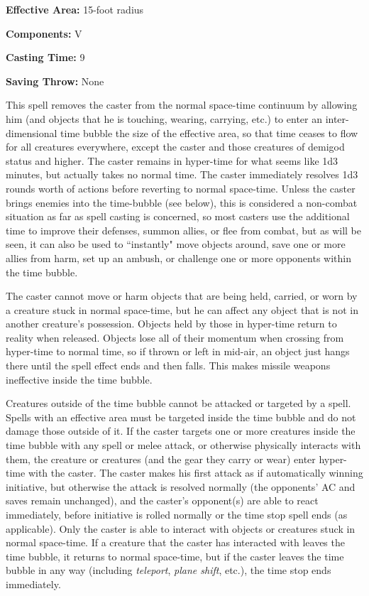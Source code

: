 \begin{multicols}{2}
\begin{minipage}{\columnwidth}
\noindent \textbf{Effective Area:} 15-foot radius

\noindent \textbf{Components:} V

\noindent \textbf{Casting Time:} 9

\noindent \textbf{Saving Throw:} None

\end{minipage}

This spell removes the caster from the normal space-time continuum by allowing him (and objects that he is touching, wearing, carrying, etc.) to enter an inter-dimensional time bubble the size of the effective area, so that time ceases to flow for all creatures everywhere, except the caster and those creatures of demigod status and higher.  The caster remains in hyper-time for what seems like 1d3 minutes, but actually takes no normal time.  The caster immediately resolves 1d3 rounds worth of actions before reverting to normal space-time.  Unless the caster brings enemies into the time-bubble (see below), this is considered a non-combat situation as far as spell casting is concerned, so most casters use the additional time to improve their defenses, summon allies, or flee from combat, but as will be seen, it can also be used to ``instantly" move objects around, save one or more allies from harm, set up an ambush, or challenge one or more opponents within the time bubble.

The caster cannot move or harm objects that are being held, carried, or worn by a creature stuck in normal space-time, but he can affect any object that is not in another creature's possession.  Objects held by those in hyper-time return to reality when released.  Objects lose all of their momentum when crossing from hyper-time to normal time, so if thrown or left in mid-air, an object just hangs there until the spell effect ends and then falls.  This makes missile weapons ineffective inside the time bubble.

Creatures outside of the time bubble cannot be attacked or targeted by a spell.  Spells with an effective area must be targeted inside the time bubble and do not damage those outside of it.  If the caster targets one or more creatures inside the time bubble with any spell or melee attack, or otherwise physically interacts with them, the creature or creatures (and the gear they carry or wear) enter hyper-time with the caster.  The caster makes his first attack as if automatically winning initiative, but otherwise the attack is resolved normally (the opponents' AC and saves remain unchanged), and the caster's opponent(s) are able to react immediately, before initiative is rolled normally or the time stop spell ends (as applicable).  Only the caster is able to interact with objects or creatures stuck in normal space-time.  If a creature that the caster has interacted with leaves the time bubble, it returns to normal space-time, but if the caster leaves the time bubble in any way (including \textit{teleport}, \textit{plane shift}, etc.), the time stop ends immediately.


\end{multicols}
